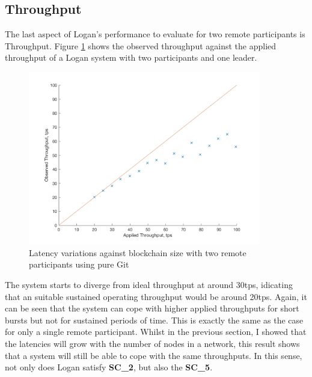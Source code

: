 \documentclass[12pt,a4paper,twoside,openright]{report}
\begin{document}
	\subsection{Throughput}
	The last aspect of Logan's performance to evaluate for two remote participants is Throughput.
	Figure \ref{figs:tworemthrthr} shows the observed throughput against the applied throughput of a Logan system with two participants and one leader.
	\begin{figure}
		\centering
		\includegraphics[width=0.9\textwidth]{figs/appliedvsobserved2r.png}
		\caption{Latency variations against blockchain size with two remote participants using pure Git}
		\label{figs:tworemthrthr}
	\end{figure}
	The system starts to diverge from ideal throughput at around 30tps, idicating that an suitable sustained operating throughput would be around 20tps.
	Again, it can be seen that the system can cope with higher applied throughputs for short bursts  but not for sustained periods of time. 
	This is exactly the same as the case for only a single remote participant. 
	Whilst in the previous section, I showed that the latencies will grow with the number of nodes in a network, this result shows that a system will still be able to cope with the same throughputs. 
	In this sense, not only does Logan satisfy \textbf{SC\_2}, but also the \textbf{SC\_5}.
\end{document}
